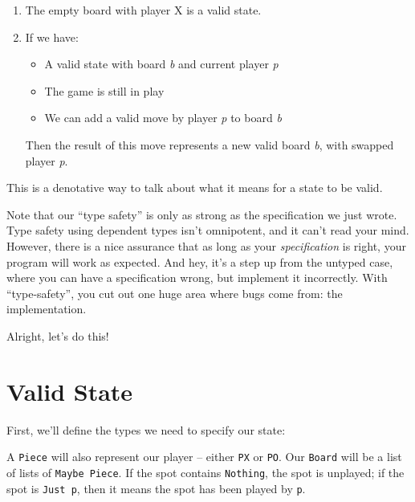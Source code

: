 \documentclass[]{article}
\newenvironment{Shaded}{}{}
\newcommand{\NormalTok}[1]{#1}
\newcommand{\OperatorTok}[1]{\textcolor[rgb]{0.40,0.40,0.40}{#1}}
\begin{document}
\begin{enumerate}
\def\labelenumi{\arabic{enumi}.}
\item
  The empty board with player X is a valid state.
\item
  If we have:

  \begin{itemize}
  \tightlist
  \item
    A valid state with board \emph{b} and current player \emph{p}
  \item
    The game is still in play
  \item
    We can add a valid move by player \emph{p} to board \emph{b}
  \end{itemize}

  Then the result of this move represents a new valid board \emph{b}, with
  swapped player \emph{p}.
\end{enumerate}

This is a denotative way to talk about what it means for a state to be valid.

Note that our ``type safety'' is only as strong as the specification we just
wrote. Type safety using dependent types isn't omnipotent, and it can't read
your mind. However, there is a nice assurance that as long as your
\emph{specification} is right, your program will work as expected. And hey, it's
a step up from the untyped case, where you can have a specification wrong, but
implement it incorrectly. With ``type-safety'', you cut out one huge area where
bugs come from: the implementation.

Alright, let's do this!

\section{Valid State}\label{valid-state}

First, we'll define the types we need to specify our state:

\begin{Shaded}
\end{Shaded}

A \texttt{Piece} will also represent our player -- either \texttt{PX} or
\texttt{PO}. Our \texttt{Board} will be a list of lists of
\texttt{Maybe\ Piece}. If the spot contains \texttt{Nothing}, the spot is
unplayed; if the spot is \texttt{Just\ p}, then it means the spot has been
played by \texttt{p}.
\end{document}

